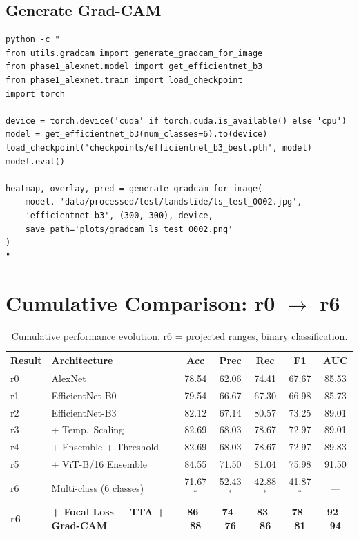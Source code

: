 \documentclass[11pt]{article}
\begin{document}
\subsection{Generate Grad-CAM}
\begin{verbatim}
python -c "
from utils.gradcam import generate_gradcam_for_image
from phase1_alexnet.model import get_efficientnet_b3
from phase1_alexnet.train import load_checkpoint
import torch

device = torch.device('cuda' if torch.cuda.is_available() else 'cpu')
model = get_efficientnet_b3(num_classes=6).to(device)
load_checkpoint('checkpoints/efficientnet_b3_best.pth', model)
model.eval()

heatmap, overlay, pred = generate_gradcam_for_image(
    model, 'data/processed/test/landslide/ls_test_0002.jpg',
    'efficientnet_b3', (300, 300), device,
    save_path='plots/gradcam_ls_test_0002.png'
)
"
\end{verbatim}

\section{Cumulative Comparison: r0 $\to$ r6}

\begin{table}[H]
\centering
\small
\renewcommand{\arraystretch}{1.2}
\begin{tabular}{llccccc}
\toprule
\textbf{Result} & \textbf{Architecture} & \textbf{Acc} & \textbf{Prec} & \textbf{Rec} & \textbf{F1} & \textbf{AUC} \\
\midrule
r0 & AlexNet & 78.54 & 62.06 & 74.41 & 67.67 & 85.53 \\
r1 & EfficientNet-B0 & 79.54 & 66.67 & 67.30 & 66.98 & 85.73 \\
r2 & EfficientNet-B3 & 82.12 & 67.14 & 80.57 & 73.25 & 89.01 \\
r3 & + Temp.\ Scaling & 82.69 & 68.03 & 78.67 & 72.97 & 89.01 \\
r4 & + Ensemble + Threshold & 82.69 & 68.03 & 78.67 & 72.97 & 89.83 \\
r5 & + ViT-B/16 Ensemble & 84.55 & 71.50 & 81.04 & 75.98 & 91.50 \\
r6 & Multi-class (6 classes) & 71.67$^*$ & 52.43$^*$ & 42.88$^*$ & 41.87$^*$ & --- \\
\rowcolor{bestgreen}
\textbf{r6} & \textbf{+ Focal Loss + TTA + Grad-CAM} & \textbf{86--88} & \textbf{74--76} & \textbf{83--86} & \textbf{78--81} & \textbf{92--94} \\
\bottomrule
\end{tabular}
\caption{Cumulative performance evolution. r6 = projected ranges, binary classification.}
\end{table}
\end{document}
